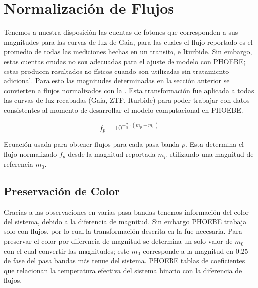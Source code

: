 \section{Normalización de Flujos} \label{Metodologia:NormalizacionFlujos}

Tenemos a nuestra disposición las cuentas de fotones que corresponden a sus
magnitudes para las curvas de luz de Gaia, para las cuales el flujo reportado es
el promedio de todas las mediciones hechas en un transito, e Iturbide. Sin
embargo, estas cuentas crudas no son adecuadas para el ajuste de modelo con
PHOEBE; estas producen resultados no físicos cuando son utilizadas sin
tratamiento adicional. Para esto las magnitudes determinadas en la sección
anterior se convierten a flujos normalizados con la
. Esta transformación fue aplicada a todas las
curvas de luz recabadas (Gaia, ZTF, Iturbide) para poder trabajar con datos
consistentes al momento de desarrollar el modelo computacional en PHOEBE.

\begin{eqfloat}[!ht]
	\centering
	\begin{equation}
		f_p = 10^{-\frac{2}{5} \cdot (m_p - m_0)}
	\end{equation}
	\caption{Ecuación usada para obtener flujos para cada pasa banda $p$. Esta
		determina el flujo normalizado $f_p$ desde la magnitud reportada $m_p$
		utilizando una magnitud de referencia $m_0$.}
	\label{normFlujosEcuacion}
\end{eqfloat}

\subsection{Preservación de Color}

Gracias a las observaciones en varias pasa bandas tenemos información del color
del sistema, debido a la diferencia de magnitud. Sin embargo PHOEBE trabaja solo
con flujos, por lo cual la transformación descrita en la
 fue necesaria. Para preservar el
color por diferencia de magnitud se determina un solo valor de $m_0$ con el cual
convertir las magnitudes; este $m_0$ corresponde a la magnitud en 0.25 de fase
del pasa bandas más tenue del sistema. PHOEBE tablas de coeficientes que
relacionan la temperatura efectiva del sistema binario con la diferencia de
flujos. 

